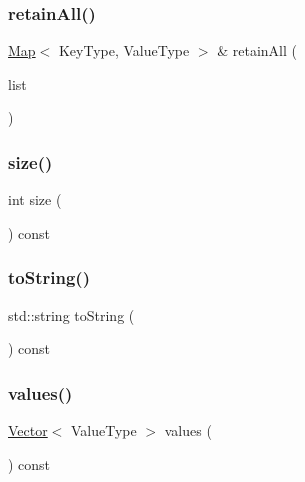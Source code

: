 \mbox{\label{classMap_a16d237e15768c6f5f3b7a9f633a6551d}} 
\subsubsection{\texorpdfstring{retain\+All()}{retainAll()}\hspace{0.1cm}{\footnotesize\ttfamily [2/2]}}
{\footnotesize\ttfamily \mbox{\hyperlink{classMap}{Map}}$<$ Key\+Type, Value\+Type $>$ \& retain\+All (\begin{DoxyParamCaption}\item[{std\+::initializer\+\_\+list$<$ std\+::pair$<$ Key\+Type, Value\+Type $>$ $>$}]{list }\end{DoxyParamCaption})}

\mbox{\label{classMap_af9593d4a5ff4274efaf429cb4f9e57cc}} 
\subsubsection{\texorpdfstring{size()}{size()}}
{\footnotesize\ttfamily int size (\begin{DoxyParamCaption}{ }\end{DoxyParamCaption}) const}

\mbox{\label{classMap_a1fe5121d6528fdea3f243321b3fa3a49}} 
\subsubsection{\texorpdfstring{to\+String()}{toString()}}
{\footnotesize\ttfamily std\+::string to\+String (\begin{DoxyParamCaption}{ }\end{DoxyParamCaption}) const}

\mbox{\label{classMap_a50ccbe4184324f0da975648a12728d20}} 
\subsubsection{\texorpdfstring{values()}{values()}}
{\footnotesize\ttfamily \mbox{\hyperlink{classVector}{Vector}}$<$ Value\+Type $>$ values (\begin{DoxyParamCaption}{ }\end{DoxyParamCaption}) const}

